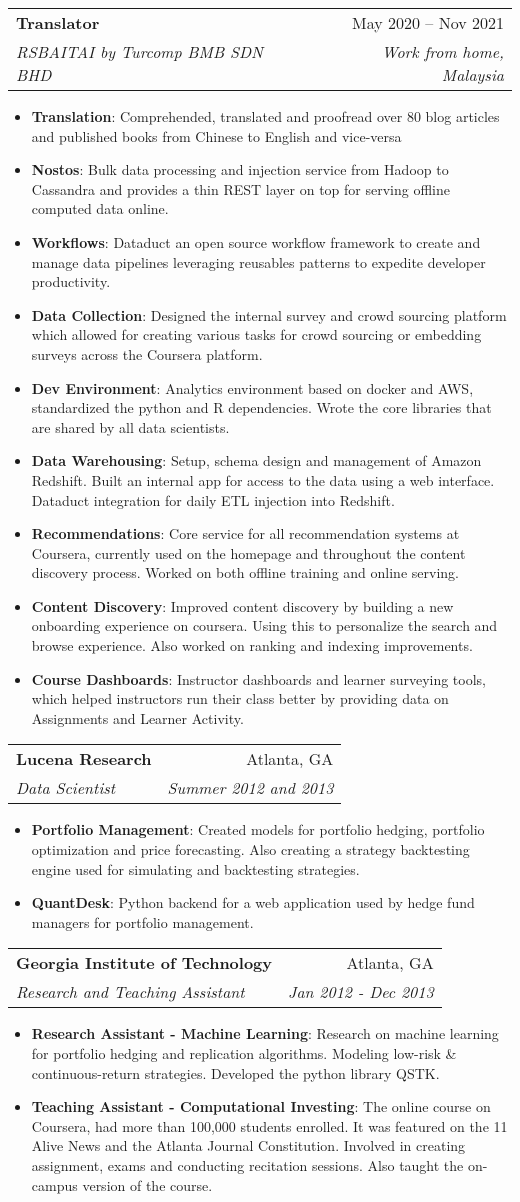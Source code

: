\documentclass[a4paper,11pt]{article}
\makeatletter
\newcommand{\resumeItem}[2]{
  \item\small{
    \textbf{#1}{: #2 \vspace{-2pt}}
  }
}
\newcommand{\resumeSubheading}[4]{
  \vspace{-1pt}\item
    \begin{tabular*}{0.97\textwidth}[t]{l@{\extracolsep{\fill}}r}
      \textbf{#1} & #2 \\
      \textit{\small#3} & \textit{\small #4} \\
    \end{tabular*}\vspace{-5pt}
}
\newcommand{\resumeItemListStart}{\begin{itemize}}
\newcommand{\resumeItemListEnd}{\end{itemize}\vspace{-5pt}}
\makeatother
\begin{document}
\resumeSubheading
{Translator}{May 2020 -- Nov 2021}
{RSBAITAI by Turcomp BMB SDN BHD}{Work from home, Malaysia}
\resumeItemListStart
\resumeItem{Translation}
{Comprehended, translated and proofread over 80 blog articles and published books from Chinese to English and vice-versa}
\resumeItem{Nostos}
{Bulk data processing and injection service from Hadoop to Cassandra and provides a thin REST layer on top for serving offline computed data online.}
\resumeItem{Workflows}
{Dataduct an open source workflow framework to create and manage data pipelines leveraging reusables patterns to expedite developer productivity.}
\resumeItem{Data Collection}
{Designed the internal survey and crowd sourcing platform which allowed for creating various tasks for crowd sourcing or embedding surveys across the Coursera platform.}
\resumeItem{Dev Environment}
{Analytics environment based on docker and AWS, standardized the python and R dependencies. Wrote the core libraries that are shared by all data scientists.}
\resumeItem{Data Warehousing}
{Setup, schema design and management of Amazon Redshift. Built an internal app for access to the data using a web interface. Dataduct integration for daily ETL injection into Redshift.}
\resumeItem{Recommendations}
{Core service for all recommendation systems at Coursera, currently used on the homepage and throughout the content discovery process. Worked on both offline training and online serving.}
\resumeItem{Content Discovery}
{Improved content discovery by building a new onboarding experience on coursera. Using this to personalize the search and browse experience. Also worked on ranking and indexing improvements.}
\resumeItem{Course Dashboards}
{Instructor dashboards and learner surveying tools, which helped instructors run their class better by providing data on Assignments and Learner Activity.}
\resumeItemListEnd

\resumeSubheading
{Lucena Research}{Atlanta, GA}
{Data Scientist}{Summer 2012 and 2013}
\resumeItemListStart
\resumeItem{Portfolio Management}
{Created models for portfolio hedging,  portfolio optimization and price forecasting. Also creating a strategy backtesting engine used for simulating and backtesting strategies.}
\resumeItem{QuantDesk}
{Python backend for a web application used by hedge fund managers for portfolio management.}
\resumeItemListEnd

\resumeSubheading
{Georgia Institute of Technology}{Atlanta, GA}
{Research and Teaching Assistant}{Jan 2012 - Dec 2013}
\resumeItemListStart
\resumeItem{Research Assistant - Machine Learning}
{Research on machine learning for portfolio hedging and replication algorithms. Modeling low-risk \& continuous-return strategies. Developed the python library QSTK.}
\resumeItem{Teaching Assistant - Computational Investing}
{The online course on Coursera, had more than 100,000 students enrolled. It was featured on the 11 Alive News and the Atlanta Journal Constitution. Involved in creating assignment, exams and conducting recitation sessions. Also taught the on-campus version of the course.}
\resumeItemListEnd
\end{document}

